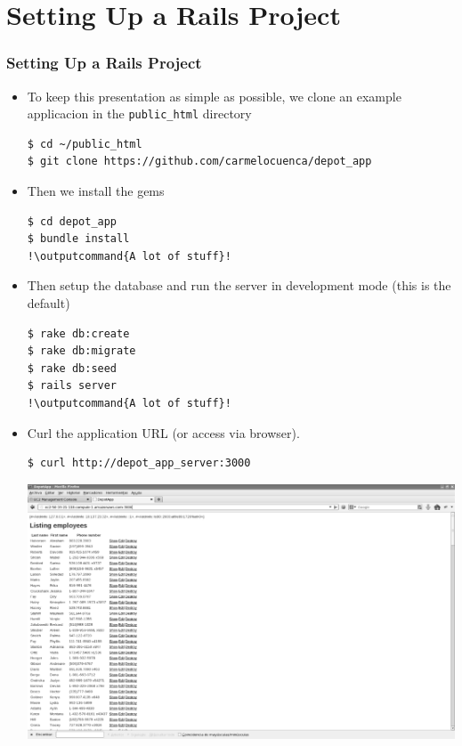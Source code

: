 \documentclass{beamer}
\newcommand{\outputcommand}[1]{\color{darkgreen}{#1}}
\begin{document}
\section{Setting Up a Rails Project}
\begin{frame}
\frametitle{Setting Up a Rails Project}
\begin{itemize}
\item To keep this presentation as simple as possible, we clone an example applicacion in the \texttt{public\_html} directory 

\lstset{language=shell, escapechar=!}
\begin{lstlisting}[escapechar=!]
$ cd ~/public_html
$ git clone https://github.com/carmelocuenca/depot_app
\end{lstlisting}

\item Then we install the gems 

\lstset{language=shell, escapechar=!}
\begin{lstlisting}[escapechar=!]
$ cd depot_app
$ bundle install
!\outputcommand{A lot of stuff}!
\end{lstlisting}

\item Then setup the database and run the server in development mode (this is the default)

\lstset{language=shell, escapechar=!}
\begin{lstlisting}[escapechar=!]
$ rake db:create
$ rake db:migrate
$ rake db:seed
$ rails server
!\outputcommand{A lot of stuff}!
\end{lstlisting}

\item Curl the application URL (or access via browser).
\begin{lstlisting}[escapechar=!]
$ curl http://depot_app_server:3000
\end{lstlisting}

\includegraphics[width=0.75 \textwidth]{tienda.eps}
\end{itemize}
\end{frame}
\end{document}
